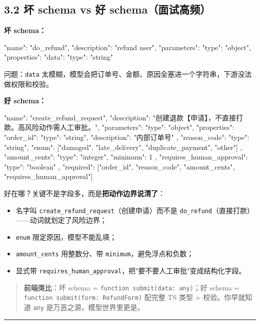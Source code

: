 \subsection{3.2 坏 schema vs 好 schema（面试高频）}

\textbf{坏 schema：}

\begin{codeblock}
{
  "name": "do_refund",
  "description": "refund user",
  "parameters": {
    "type": "object",
    "properties": { "data": { "type": "string" } }
  }
}
\end{codeblock}

问题：\texttt{data} 太模糊，模型会把订单号、金额、原因全塞进一个字符串，下游没法做权限和校验。

\textbf{好 schema：}

\begin{codeblock}
{
  "name": "create_refund_request",
  "description": "创建退款【申请】，不直接打款。高风险动作需人工审批。",
  "parameters": {
    "type": "object",
    "properties": {
      "order_id":   { "type": "string",  "description": "内部订单号" },
      "reason_code":{ "type": "string",  "enum": ["damaged", "late_delivery", "duplicate_payment", "other"] },
      "amount_cents":{ "type": "integer", "minimum": 1 },
      "requires_human_approval": { "type": "boolean" }
    },
    "required": ["order_id", "reason_code", "amount_cents", "requires_human_approval"]
  }
}
\end{codeblock}

好在哪？关键不是字段多，而是\textbf{把动作边界说清了}：
\begin{itemize}[leftmargin=2em]
\item 名字叫 \texttt{create\_refund\_request}（创建申请）而不是 \texttt{do\_refund}（直接打款）——动词就划定了风险边界；
\item \texttt{enum} 限定原因，模型不能乱填；
\item \texttt{amount\_cents} 用整数分、带 \texttt{minimum}，避免浮点和负数；
\item 显式带 \texttt{requires\_human\_approval}，把"要不要人工审批"变成结构化字段。
\end{itemize}

\begin{quote}
 \textbf{前端类比}：坏 schema = \texttt{function submit(data: any)}；好 schema = \texttt{function submit(form: RefundForm)} 配完整 TS 类型 + 校验。你早就知道 \texttt{any} 是万恶之源，模型世界里更是。
\end{quote}

\bigskip\hrule\bigskip


